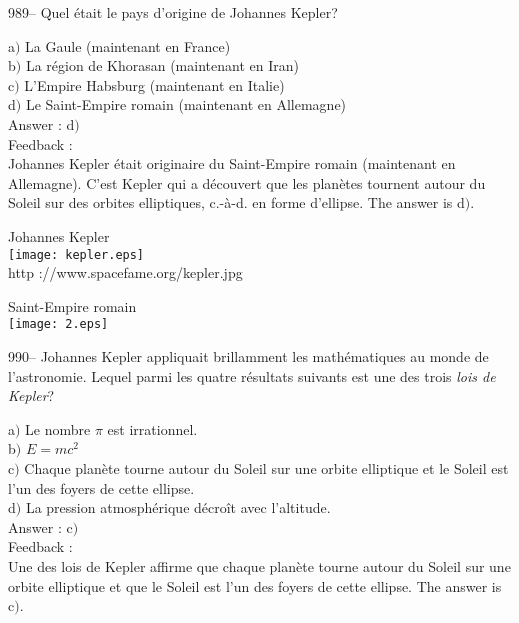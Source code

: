 ﻿\documentclass[letterpaper, 12pt]{article}
\begin{document}
989-- Quel \'etait le pays d'origine de Johannes Kepler?

a$)$ La Gaule (maintenant en France) \\
b$)$ La r\'egion de Khorasan (maintenant en Iran) \\
c$)$ L'Empire Habsburg (maintenant en Italie) \\
d$)$ Le Saint-Empire romain (maintenant en Allemagne)\\

Answer : d$)$\\

Feedback : \\
Johannes Kepler \'etait originaire du Saint-Empire romain
(maintenant en Allemagne). C'est Kepler qui a d\'ecouvert que les
plan\`etes tournent autour du Soleil sur des orbites elliptiques,
c.-\`a-d. en forme d'ellipse.
The answer is d$)$.\\

        \begin{center}
        Johannes Kepler\\
    \texttt{[image: kepler.eps]}\\
        {\footnotesize http ://www.spacefame.org/kepler.jpg}
    \end{center}

        \begin{center}
        Saint-Empire romain\\
    \texttt{[image: 2.eps]}\\
    \end{center}

990-- Johannes Kepler appliquait brillamment les math\'ematiques au
monde de l'astronomie. Lequel parmi les quatre r\'esultats suivants
est une des trois {\sl lois de Kepler}?

a$)$ Le nombre $\pi$ est irrationnel.\\
b$)$ $E=mc^2$ \\
c$)$ Chaque plan\`ete tourne autour du Soleil sur une orbite
elliptique et le Soleil
est l'un des foyers de cette ellipse. \\
d$)$ La pression atmosph\'erique d\'ecro\^it avec l'altitude.\\

Answer : c$)$\\

Feedback : \\
Une des lois de Kepler affirme que chaque plan\`ete tourne autour du
Soleil sur une orbite elliptique et que le Soleil
est l'un des foyers de cette ellipse. The answer is c$)$.\\
\end{document}
